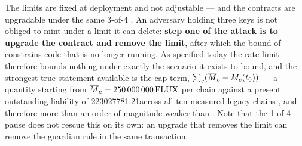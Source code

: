 \begin{remark}
\label{rem:upgrade-voids}
The limits are fixed at deployment and not adjustable --- and the contracts are upgradable under the
same 3-of-4 . An adversary holding three keys is not
obliged to mint under a limit it can delete: \textbf{step one of the attack is to upgrade the
contract and remove the limit}, after which the bound of  constrains code that
is no longer running. As specified today the rate limit therefore bounds nothing under exactly the
scenario it exists to bound, and the strongest true statement available is the cap term,
$\sum_c(\overline{M}_{c} - M_c(t_0))$ --- a quantity starting from $\overline{M}_{c} = \num{250000000}\,\mathrm{FLUX}$ per
chain against a present outstanding liability of \num{223027781.21}\flux across all ten measured
legacy chains , and therefore more than an
order of magnitude weaker than . Note that the 1-of-4 pause does not rescue
this on its own: an upgrade that removes the limit can remove the guardian rule in the same
transaction.


\end{remark}
